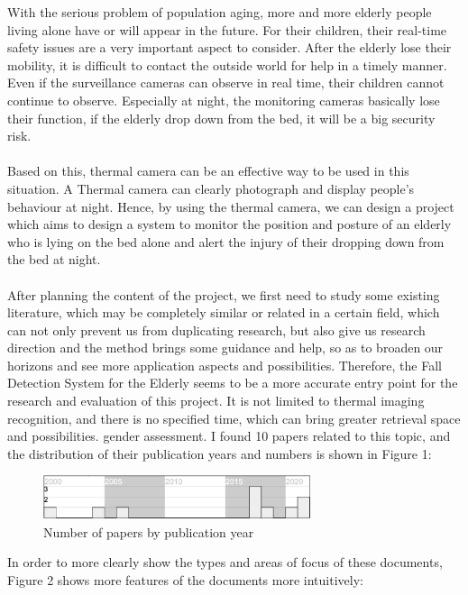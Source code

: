 \documentclass[12pt]{article}
\begin{document}
With the serious problem of population aging, more and more elderly people living alone have or will appear in the future. For their children, their real-time safety issues are a very important aspect to consider. After the elderly lose their mobility, it is difficult to contact the outside world for help in a timely manner. Even if the surveillance cameras can observe in real time, their children cannot continue to observe. Especially at night, the monitoring cameras basically lose their function, if the elderly drop down from the bed, it will be a big security risk.
\\ \hspace*{\fill} \\
Based on this, thermal camera can be an effective way to be used in this situation. A Thermal camera can clearly photograph and display people's behaviour at night. Hence, by using the thermal camera, we can design a project which aims to design a system to monitor the position and posture of an elderly who is lying on the bed alone and alert the injury of their dropping down from the bed at night. 
\\ \hspace*{\fill} \\
After planning the content of the project, we first need to study some existing literature, which may be completely similar or related in a certain field, which can not only prevent us from duplicating research, but also give us research direction and the method brings some guidance and help, so as to broaden our horizons and see more application aspects and possibilities. Therefore, the Fall Detection System for the Elderly seems to be a more accurate entry point for the research and evaluation of this project. It is not limited to thermal imaging recognition, and there is no specified time, which can bring greater retrieval space and possibilities. gender assessment. I found 10 papers related to this topic, and the distribution of their publication years and numbers is shown in Figure 1:

\begin{figure}[H]
\centering
\includegraphics[width=0.7\textwidth]{meta-data.png}
\caption{Number of papers by publication year} 
\end{figure}

\noindent In order to more clearly show the types and areas of focus of these documents, Figure 2 shows more features of the documents more intuitively:
\end{document}
